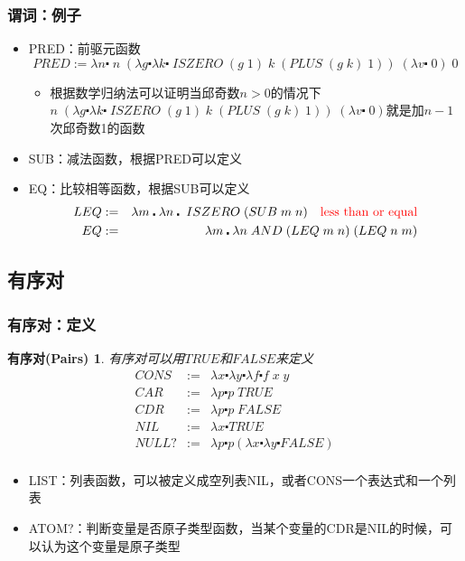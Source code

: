 \documentclass[CJK,compress,hyperref]{beamer}
\begin{document}
\begin{CJK}{UTF8}{song}
\begin{frame}
  \frametitle{谓词：例子} 
  \begin{itemize}
  \item PRED：前驱元函数
    \begin{displaymath}
      PRED := \lambda n \centerdot \; n \; (\lambda g \centerdot \lambda k \centerdot \; ISZERO \; (g \; 1) \; k \; (PLUS \; (g \; k) \; 1)) \; (\lambda v \centerdot \; 0) \; 0
    \end{displaymath} 
    \begin{itemize}
    \item 根据数学归纳法可以证明当邱奇数$n > 0$的情况下$n \; (\lambda g \centerdot \lambda k \centerdot \; ISZERO \; (g \; 1) \; k \; (PLUS \; (g \; k) \; 1)) \; (\lambda v \centerdot \; 0)$就是加$n-1$次邱奇数1的函数
    \end{itemize} 
  \item SUB：减法函数，根据PRED可以定义 
  \item EQ：比较相等函数，根据SUB可以定义
    \begin{eqnarray*}
      LEQ & :=  & \lambda m \centerdot \lambda n \centerdot \; ISZERO \; (SUB\;m\;n) \quad {\color{red}\textrm{less than or equal}} \\ 
      EQ & := & \lambda m \centerdot \lambda n \; AND \; (LEQ \; m \; n) \; (LEQ \; n \; m) 
    \end{eqnarray*}
  \end{itemize}
\end{frame}

\subsection{有序对}
\begin{frame}
  \frametitle{有序对：定义} 
  \newtheorem{pairs}{有序对(Pairs)}
  \begin{pairs}
    有序对可以用$TRUE$和$FALSE$来定义　
    \begin{eqnarray*}
      CONS & := & \lambda x \centerdot \lambda y \centerdot \lambda f \centerdot f \; x \; y \\ 
      CAR & := & \lambda p \centerdot p \; TRUE \\
      CDR & := & \lambda p \centerdot p \; FALSE \\ 
      NIL & := & \lambda x \centerdot TRUE \\
      NULL? & := & \lambda p \centerdot p(\lambda x \centerdot \lambda y \centerdot FALSE) \\
    \end{eqnarray*} 
  \end{pairs}
  \begin{itemize}
  \item LIST：列表函数，可以被定义成空列表NIL，或者CONS一个表达式和一个列表 
  \item ATOM?：判断变量是否原子类型函数，当某个变量的CDR是NIL的时候，可以认为这个变量是原子类型 
  \end{itemize}
\end{frame}


\end{CJK}
\end{document}
